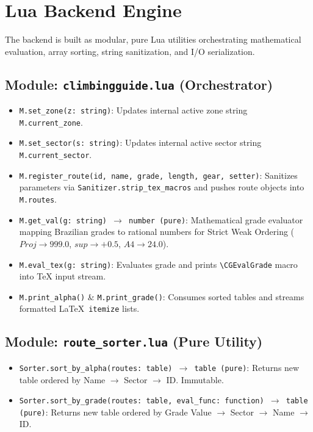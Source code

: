 \clearpage
\section{Lua Backend Engine}

The backend is built as modular, pure Lua utilities orchestrating mathematical evaluation, array sorting, string sanitization, and I/O serialization.

\subsection{Module: \texttt{climbingguide.lua} (Orchestrator)}
{\small
\begin{itemize}
    \item \texttt{M.set\_zone(z: string)}: Updates internal active zone string \texttt{M.current\_zone}.
    \item \texttt{M.set\_sector(s: string)}: Updates internal active sector string \texttt{M.current\_sector}.
    \item \texttt{M.register\_route(id, name, grade, length, gear, setter)}: Sanitizes parameters via \texttt{Sanitizer.strip\_tex\_macros} and pushes route objects into \texttt{M.routes}.
    \item \texttt{M.get\_val(g: string) $\to$ number (pure)}: Mathematical grade evaluator mapping Brazilian grades to rational numbers for Strict Weak Ordering ($Proj \to 999.0$, $sup \to +0.5$, $A4 \to 24.0$).
    \item \texttt{M.eval\_tex(g: string)}: Evaluates grade and prints \texttt{\textbackslash CGEvalGrade} macro into TeX input stream.
    \item \texttt{M.print\_alpha()} \& \texttt{M.print\_grade()}: Consumes sorted tables and streams formatted \LaTeX\ \texttt{itemize} lists.
\end{itemize}
}

\subsection{Module: \texttt{route\_sorter.lua} (Pure Utility)}
{\small
\begin{itemize}
    \item \texttt{Sorter.sort\_by\_alpha(routes: table) $\to$ table (pure)}: Returns new table ordered by Name $\to$ Sector $\to$ ID. Immutable.
    \item \texttt{Sorter.sort\_by\_grade(routes: table, eval\_func: function) $\to$ table (pure)}: Returns new table ordered by Grade Value $\to$ Sector $\to$ Name $\to$ ID.
\end{itemize}
}

